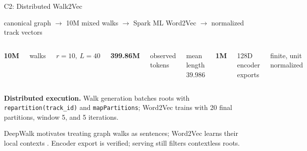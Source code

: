 \documentclass{beamer}
\begin{document}
\begin{frame}{C2: Distributed Walk2Vec}

\vspace{.05cm}
\begin{center}
  {\large
  canonical graph
  \(\longrightarrow\)
  10M mixed walks
  \(\longrightarrow\)
  Spark ML Word2Vec
  \(\longrightarrow\)
  normalized track vectors}
\end{center}

\vspace{.38cm}
\begin{columns}[c,onlytextwidth]
  \centering
  {\fontsize{25}{27}\selectfont\bfseries\color{projectteal}10M}\par
  {\large walks}\par
  {\small \(r=10,\ L=40\)}

  \centering
  {\fontsize{25}{27}\selectfont\bfseries\color{projectblue}399.86M}\par
  {\large observed tokens}\par
  {\small mean length \(39.986\)}

  \centering
  {\fontsize{25}{27}\selectfont\bfseries\color{projectgold}1M}\par
  {\large 128D encoder exports}\par
  {\small finite, unit normalized}
\end{columns}

\vspace{.42cm}
{\small
\textbf{Distributed execution.}
Walk generation batches roots with \texttt{repartition(track\_id)} and \texttt{mapPartitions}; Word2Vec trains with 20 final partitions, window 5, and 5 iterations.}

\vfill
{\footnotesize DeepWalk motivates treating graph walks as sentences; Word2Vec learns their local contexts \autocite{perozzi2014deepwalk,mikolov2013efficient}. Encoder export is verified; serving still filters contextless roots.}

\end{frame}
\end{document}
